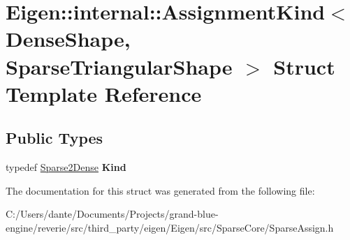 \hypertarget{struct_eigen_1_1internal_1_1_assignment_kind_3_01_dense_shape_00_01_sparse_triangular_shape_01_4}{}\section{Eigen\+::internal\+::Assignment\+Kind$<$ Dense\+Shape, Sparse\+Triangular\+Shape $>$ Struct Template Reference}
\label{struct_eigen_1_1internal_1_1_assignment_kind_3_01_dense_shape_00_01_sparse_triangular_shape_01_4}
\subsection*{Public Types}
\begin{DoxyCompactItemize}
\item 
\mbox{\label{struct_eigen_1_1internal_1_1_assignment_kind_3_01_dense_shape_00_01_sparse_triangular_shape_01_4_a7f749cee63493922e4c4a9c9d8e8cb84}} 
typedef \mbox{\hyperlink{struct_eigen_1_1internal_1_1_sparse2_dense}{Sparse2\+Dense}} {\bfseries Kind}
\end{DoxyCompactItemize}


The documentation for this struct was generated from the following file\+:\begin{DoxyCompactItemize}
\item 
C\+:/\+Users/dante/\+Documents/\+Projects/grand-\/blue-\/engine/reverie/src/third\+\_\+party/eigen/\+Eigen/src/\+Sparse\+Core/Sparse\+Assign.\+h\end{DoxyCompactItemize}
